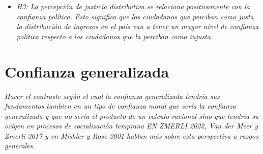 \documentclass[12pt,twoside]{templates/facsothesis}
\providecommand{\tightlist}{%
  \setlength{\itemsep}{0pt}\setlength{\parskip}{0pt}}
\begin{document}
\begin{itemize}
\tightlist
\item
  \emph{H3: La percepción de justicia distributiva se relaciona positivamente con la confianza política. Esto significa que los ciudadanos que perciban como justa la distribución de ingresos en el país van a tener un mayor nivel de confianza política respecto a los ciudadanos que la perciban como injusta.}
\end{itemize}

\section{Confianza generalizada}\label{confianza-generalizada}

\emph{Hacer el contraste según el cual la confianza generalizada tendría sus fundamentos tambien en un tipo de confianza moral que sería la confianza generalizada y que no sería el producto de un calculo racional sino que tendría su origen en procesos de socialización temprana} \emph{EN ZMERLI 2022, Van der Meer y Zmerli 2017 y en Mishler y Rose 2001 hablan más sobre esta perspectiva a rasgos generales}
\end{document}
